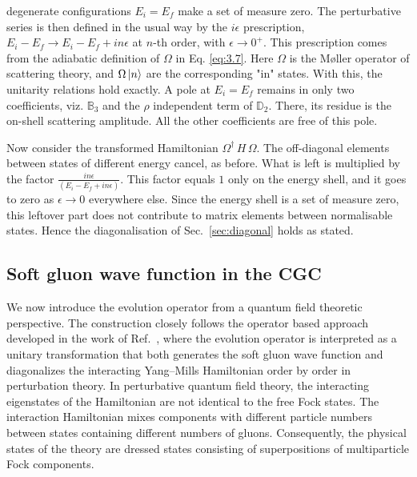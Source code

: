 \documentclass[a4paper,11pt]{article}
\def\mf#1{\mathbb{#1}}
\begin{document}
{ degenerate configurations $E_{i} = E_{f}$ make a set of measure zero. The perturbative series is then defined in the usual way by the $i\epsilon$ prescription, $E_{i}-E_{f} \rightarrow E_{i}-E_{f} +in\epsilon$ at $n$-th order, with $\epsilon\rightarrow 0^{+}$. This prescription comes from the adiabatic definition of $\Omega$ in Eq. \eqref{eq:3.7}. Here $\Omega$ is the M{\o}ller operator of scattering theory, and $\Omega\ket{n}$ are the corresponding "in" states. With this, the unitarity relations hold exactly. A pole at $E_{i} = E_{f}$ remains in only two coefficients, viz. $\mf{B}_{3}$ and the $\rho$ independent term of $\mf{D}_{2}$. There, its residue is the on-shell scattering amplitude. All the other coefficients are free of this pole.

Now consider the transformed Hamiltonian $\Omega^{\dagger}\,H\,\Omega$. The off-diagonal elements between states of different energy cancel, as before. What is left is multiplied by the factor $\frac{in\epsilon}{(E_{i}-E_{f}+in\epsilon)}$. This factor equals $1$ only on the energy shell, and it goes to zero as $\epsilon \rightarrow 0$ everywhere else. Since the energy shell is a set of measure zero, this leftover part does not contribute to matrix elements between normalisable states. Hence the diagonalisation of Sec.~\ref{sec:diagonal} holds as stated.}
\subsection{Soft gluon wave function in the CGC} \label{sec:LCWF1}
We now introduce the evolution operator from a quantum field theoretic perspective. The construction closely follows the operator based approach developed in the work of Ref.~\cite{kovner2019entanglement}, where the evolution operator is interpreted as a unitary transformation that both generates the soft gluon wave function and diagonalizes the interacting Yang–Mills Hamiltonian order by order in perturbation theory. In perturbative quantum field theory, the interacting eigenstates of the Hamiltonian are not identical to the free Fock states. The interaction Hamiltonian mixes components with different particle numbers between states containing different numbers of gluons. Consequently, the physical states of the theory are dressed states consisting of superpositions of multiparticle Fock components.
\end{document}

